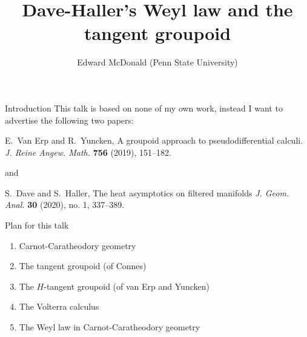 \documentclass{beamer}
\newcommand\makebeamertitle{\frame{\maketitle}}%
\numberwithin{equation}{section}
\theoremstyle{plain}
\theoremstyle{plain}
\theoremstyle{definition}
\theoremstyle{plain}
\theoremstyle{plain}
\theoremstyle{definition}
\begin{document}
\title[Weyl law and the tangent groupoid]{Dave-Haller's Weyl law and the tangent groupoid}


\author[E. McDonald]{Edward McDonald (Penn State University)}



\makebeamertitle


\begin{frame}{Introduction}
  This talk is based on none of my own work, instead I want to advertise the following two papers:
  \begin{center}
    E.~Van Erp and R.~Yuncken, A groupoid approach to pseudodifferential calculi. \emph{J. Reine Angew. Math.} \textbf{756} (2019), 151--182.
  \end{center}
  and
  \begin{center}
    S.~Dave and S.~Haller, The heat asymptotics on filtered manifolds \emph{J. Geom. Anal.} \textbf{30} (2020), no. 1, 337--389.
  \end{center}
\end{frame}

\begin{frame}{Plan for this talk}
    \begin{enumerate}
        \item{} Carnot-Caratheodory geometry
        \item{} The tangent groupoid (of Connes)
        \item{} The $H$-tangent groupoid (of van Erp and Yuncken)
        \item{} The Volterra calculus
        \item{} The Weyl law in Carnot-Caratheodory geometry
    \end{enumerate}
\end{frame}


\begin{frame}
\end{frame}
\end{document}
